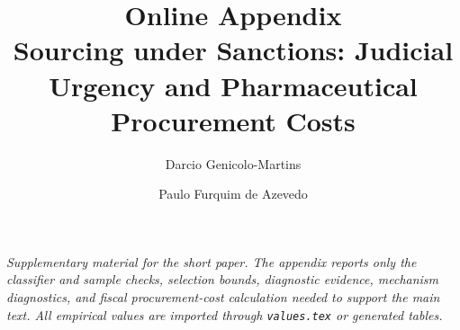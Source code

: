 \documentclass[11pt,authoryear]{elsarticle}
\numberwithin{table}{section}
\numberwithin{figure}{section}
\begin{document}
\begin{frontmatter}
\title{Online Appendix\\[5pt]
\normalsize Sourcing under Sanctions: Judicial Urgency and Pharmaceutical Procurement Costs}
\author[INSPER]{Darcio Genicolo-Martins}
\author[INSPER]{Paulo Furquim de Azevedo}
\address[INSPER]{Insper Institute of Education and Research, S\~ao Paulo, Brazil}
\end{frontmatter}

\singlespacing
\noindent\textit{Supplementary material for the short paper. The appendix reports only the classifier and sample checks, selection bounds, diagnostic evidence, mechanism diagnostics, and fiscal procurement-cost calculation needed to support the main text. All empirical values are imported through \texttt{values.tex} or generated tables.}


\end{document}
